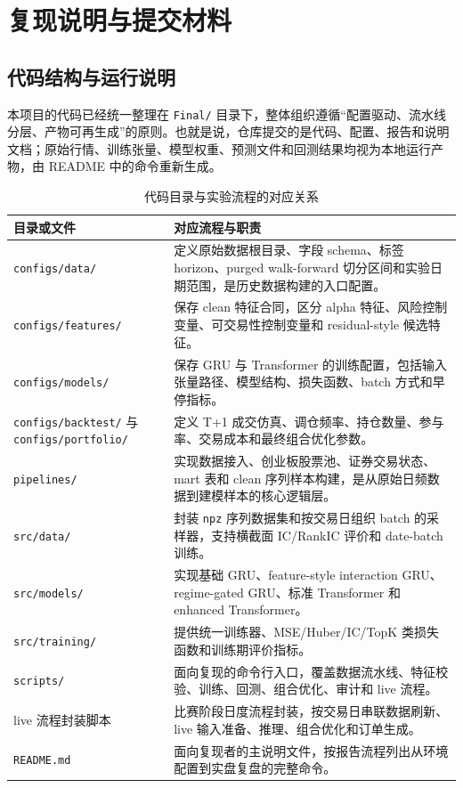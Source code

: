 \documentclass[12pt,a4paper,cn,bibtex]{elegantpaper}
\begin{document}
\section{复现说明与提交材料}

\subsection{代码结构与运行说明}
本项目的代码已经统一整理在 \texttt{Final/} 目录下，整体组织遵循“配置驱动、流水线分层、产物可再生成”的原则。也就是说，仓库提交的是代码、配置、报告和说明文档；原始行情、训练张量、模型权重、预测文件和回测结果均视为本地运行产物，由 README 中的命令重新生成。

\begin{table}[H]
    \centering
    \small
    \begin{tabular}{p{}p{}}
        \toprule
        \textbf{目录或文件} & \textbf{对应流程与职责} \\
        \midrule
        \texttt{configs/data/} & 定义原始数据根目录、字段 schema、标签 horizon、purged walk-forward 切分区间和实验日期范围，是历史数据构建的入口配置。\\
        \texttt{configs/features/} & 保存 clean 特征合同，区分 alpha 特征、风险控制变量、可交易性控制变量和 residual-style 候选特征。\\
        \texttt{configs/models/} & 保存 GRU 与 Transformer 的训练配置，包括输入张量路径、模型结构、损失函数、batch 方式和早停指标。\\
        \texttt{configs/backtest/} 与 \texttt{configs/portfolio/} & 定义 T+1 成交仿真、调仓频率、持仓数量、参与率、交易成本和最终组合优化参数。\\
        \texttt{pipelines/} & 实现数据接入、创业板股票池、证券交易状态、mart 表和 clean 序列样本构建，是从原始日频数据到建模样本的核心逻辑层。\\
        \texttt{src/data/} & 封装 \texttt{npz} 序列数据集和按交易日组织 batch 的采样器，支持横截面 IC/RankIC 评价和 date-batch 训练。\\
        \texttt{src/models/} & 实现基础 GRU、feature-style interaction GRU、regime-gated GRU、标准 Transformer 和 enhanced Transformer。\\
        \texttt{src/training/} & 提供统一训练器、MSE/Huber/IC/TopK 类损失函数和训练期评价指标。\\
        \texttt{scripts/} & 面向复现的命令行入口，覆盖数据流水线、特征校验、训练、回测、组合优化、审计和 live 流程。\\
        live 流程封装脚本 & 比赛阶段日度流程封装，按交易日串联数据刷新、live 输入准备、推理、组合优化和订单生成。\\
        \texttt{README.md} & 面向复现者的主说明文件，按报告流程列出从环境配置到实盘复盘的完整命令。\\
        \bottomrule
    \end{tabular}
    \caption{代码目录与实验流程的对应关系}
\end{table}
\end{document}
